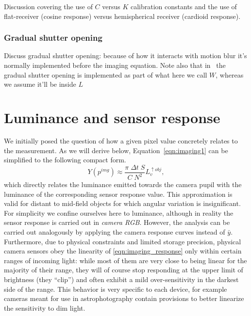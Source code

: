 \begin{inconstruction}
	Discussion covering the use of $C$ versus $K$ calibration constants and
	the use of flat-receiver (cosine response) versus hemispherical receiver 
	(cardioid response).
\end{inconstruction}

\subsubsection{Gradual shutter opening}

\begin{inconstruction}
	Discuss gradual shutter opening: because of how it interacts with motion blur
	it's normally implemented before the imaging equation.
	Note also that in~\cite{kolb95} the gradual shutter opening is implemented as part of what here
	we call $W$, whereas we assume it'll be inside $L$
\end{inconstruction}

\section{Luminance and sensor response}


We initially posed the question of how a given pixel value concretely
relates to the measurement. As we will derive below,
Equation~\eqref{eqn:imaging1} can be simplified to the following
compact form.
\begin{equation}\label{eqn:imaging_response}
	Y(p^{img}) \approx \frac{ \pi\;\Delta t\;S}{C\; N^2} L_v^{\uparrow obj},
\end{equation}
which directly relates the luminance emitted towards the camera pupil
with the luminance of the corresponding sensor response value. This approximation
is valid for distant to mid-field objects for which angular variation
is insignificant. For simplicity we confine ourselves here to luminance, although in
reality the sensor response is carried out in \textit{camera RGB}. However, the
analysis can be carried out analogously by applying the camera
response curves instead of $\bar y$. Furthermore, due to physical
constraints and limited storage precision, physical camera sensors
obey the linearity of \cref{eqn:imaging_response} only within certain
ranges of incoming light: while most of them are very close to being linear for the
majority of their range, they will of course stop responding at the upper limit of 
brightness (they ``clip'') and often exhibit a mild over-sensitivity in the darkest 
side of the range. This behavior is very specific to each device, 
for example cameras meant for use in astrophotography contain provisions 
to better linearize the sensitivity to dim light.

